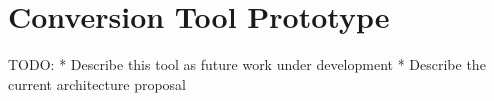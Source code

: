 \section{Conversion Tool Prototype}
\label{sec:prototype}

TODO:
  * Describe this tool as future work under development
  * Describe the current architecture proposal








